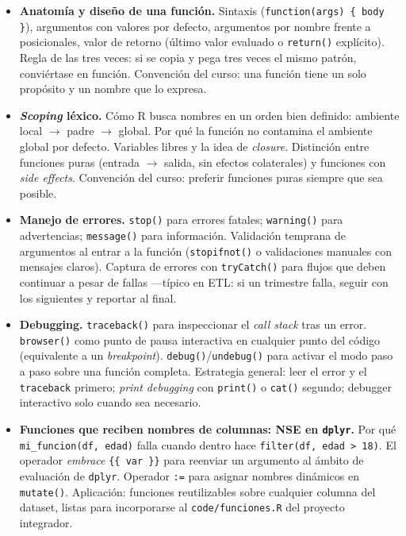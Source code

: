 \documentclass[11pt,letterpaper]{article}
\newcommand{\blue}[1]{{\color{cerulean}#1}}
\begin{document}
\begin{itemize}[leftmargin=*, itemsep=2pt]
    \item \textbf{Anatomía y diseño de una función.} Sintaxis (\texttt{function(args) \{ body \}}), argumentos con valores por defecto, argumentos por nombre frente a posicionales, valor de retorno (último valor evaluado o \texttt{return()} explícito). \blue{Regla de las tres veces}: si se copia y pega tres veces el mismo patrón, conviértase en función. Convención del curso: una función tiene un solo propósito y un nombre que lo expresa.
    \item \textbf{\textit{Scoping} léxico.} Cómo R busca nombres en un orden bien definido: ambiente local $\to$ padre $\to$ global. Por qué la función no contamina el ambiente global por defecto. Variables libres y la idea de \textit{closure}. Distinción entre \blue{funciones puras} (entrada $\to$ salida, sin efectos colaterales) y funciones con \textit{side effects}. Convención del curso: preferir funciones puras siempre que sea posible.
    \item \textbf{Manejo de errores.} \texttt{stop()} para errores fatales; \texttt{warning()} para advertencias; \texttt{message()} para información. Validación temprana de argumentos al entrar a la función (\texttt{stopifnot()} o validaciones manuales con mensajes claros). Captura de errores con \texttt{tryCatch()} para flujos que deben continuar a pesar de fallas ---típico en ETL: si un trimestre falla, seguir con los siguientes y reportar al final.
    \item \textbf{Debugging.} \texttt{traceback()} para inspeccionar el \textit{call stack} tras un error. \texttt{browser()} como punto de pausa interactiva en cualquier punto del código (equivalente a un \textit{breakpoint}). \texttt{debug()}/\texttt{undebug()} para activar el modo paso a paso sobre una función completa. Estrategia general: leer el error y el \texttt{traceback} primero; \textit{print debugging} con \texttt{print()} o \texttt{cat()} segundo; debugger interactivo solo cuando sea necesario.
    \item \textbf{Funciones que reciben nombres de columnas: NSE en \texttt{dplyr}.} Por qué \texttt{mi\_funcion(df, edad)} falla cuando dentro hace \texttt{filter(df, edad > 18)}. El operador \blue{\textit{embrace}} \texttt{\{\{~var~\}\}} para reenviar un argumento al ámbito de evaluación de \texttt{dplyr}. Operador \texttt{:=} para asignar nombres dinámicos en \texttt{mutate()}. Aplicación: funciones reutilizables sobre cualquier columna del dataset, listas para incorporarse al \texttt{code/funciones.R} del proyecto integrador.
\end{itemize}
\end{document}
